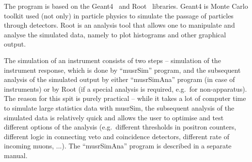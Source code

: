 \documentclass[twoside]{dis04}
\begin{document}
The program is based on the Geant4~\cite{geant} and Root~\cite{root} libraries.
Geant4 is Monte Carlo toolkit used (not only) in particle physics to simulate
the passage of particles through detectors.
Root is an analysis tool that allows one to manipulate and analyse the simulated data, 
namely to plot histograms and other graphical output.

The simulation of an instrument consists of two steps -- simulation of the instrument
response, which is done by ``musrSim'' program, and the subsequent analysis of the
simulated output by either ``musrSimAna'' program (in case of \musr instruments) or
by Root (if a special analysis is required, e.g.\ for non-\musr apparatus).
The reason for this spit is purely
practical -- while it takes a lot of computer time to simulate large statistics data
with musrSim, the subsequent analysis of the simulated data is relatively quick
and allows the user to optimise and test different options of the analysis 
(e.g.\ different thresholds in positron counters, different logic in connecting 
veto and coincidence detectors, different rate of incoming muons, ...).
The ``musrSimAna'' program is described in a separate manual.
\end{document}
